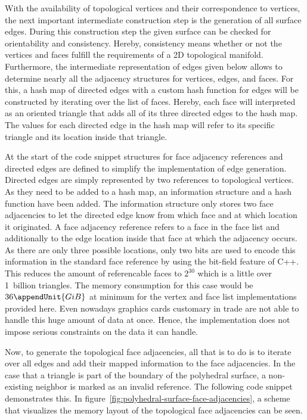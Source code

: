 \documentclass{stdlocal}
\begin{document}
  With the availability of topological vertices and their correspondence to vertices, the next important intermediate construction step is the generation of all surface edges.
  During this construction step the given surface can be checked for orientability and consistency.
  Hereby, consistency means whether or not the vertices and faces fulfill the requirements of a 2D topological manifold.
  Furthermore, the intermediate representation of edges given below allows to determine nearly all the adjacency structures for vertices, edges, and faces.
  For this, a hash map of directed edges with a custom hash function for edges will be constructed by iterating over the list of faces.
  Hereby, each face will interpreted as an oriented triangle that adds all of its three directed edges to the hash map.
  The values for each directed edge in the hash map will refer to its specific triangle and its location inside that triangle.

  At the start of the code snippet structures for face adjacency references and directed edges are defined to simplify the implementation of edge generation.
  Directed edges are simply represented by two references to topological vertices.
  As they need to be added to a hash map, an information structure and a hash function have been added.
  The information structure only stores two face adjacencies to let the directed edge know from which face and at which location it originated.
  A face adjacency reference refers to a face in the face list and additionally to the edge location inside that face at which the adjacency occurs.
  As there are only three possible locations, only two bits are used to encode this information in the standard face reference by using the bit-field feature of C++.
  This reduces the amount of referencable faces to $2^{30}$ which is a little over 1~billion triangles.
  The memory consumption for this case would be $36\appendUnit{GiB}$ at minimum for the vertex and face list implementations provided here.
  Even nowadays graphics cards customary in trade are not able to handle this huge amount of data at once.
  Hence, the implementation does not impose serious constraints on the data it can handle.

  Now, to generate the topological face adjacencies, all that is to do is to iterate over all edges and add their mapped information to the face adjacencies.
  In the case that a triangle is part of the boundary of the polyhedral surface, a non-existing neighbor is marked as an invalid reference.
  The following code snippet demonstrates this.
  In figure~\ref{fig:polyhedral-surface-face-adjacencies}, a scheme that visualizes the memory layout of the topological face adjacencies can be seen.
\end{document}
